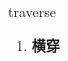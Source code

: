 
\begin{frame}
{\huge traverse}
\begin{center}
\begin{enumerate}\Large
  \item \textbf{横穿}
\end{enumerate}
\end{center}
\end{frame}
